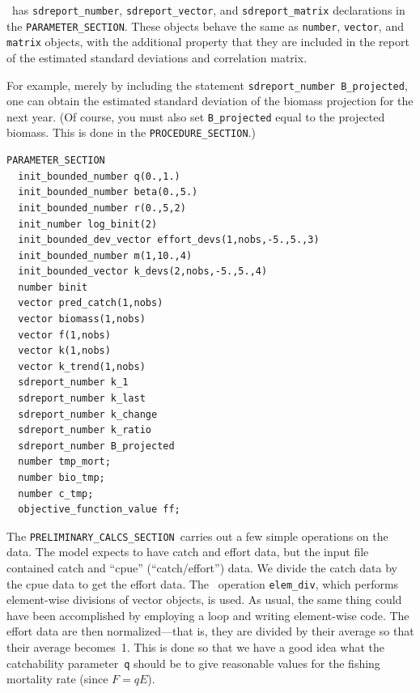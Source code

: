 \documentclass{admbmanual}
\newcommand\PS{\texttt{PARAMETER\_SECTION}}
\newcommand\PCS{\texttt{PRELIMINARY\_CALCS\_SECTION}}
\newcommand\PROS{\texttt{PROCEDURE\_SECTION}}
\begin{document}
\ADM\ has \texttt{sdreport\_number}, \texttt{sdreport\_vector}, and
\texttt{sdreport\_matrix} declarations in the \PS. These objects behave the same
as \texttt{number}, \texttt{vector}, and \texttt{matrix} objects, with the
additional property that they are included in the report of the estimated
standard deviations and correlation matrix.

For example, merely by including the statement
\texttt{sdreport\_number B\_projected}, one can obtain the estimated standard
deviation of the biomass projection for the next year. (Of course, you must also
set \texttt{B\_projected} equal to the projected biomass. This is done in the
\PROS.)
\begin{lstlisting}
PARAMETER_SECTION
  init_bounded_number q(0.,1.)
  init_bounded_number beta(0.,5.)
  init_bounded_number r(0.,5,2)
  init_number log_binit(2)
  init_bounded_dev_vector effort_devs(1,nobs,-5.,5.,3)
  init_bounded_number m(1,10.,4)
  init_bounded_vector k_devs(2,nobs,-5.,5.,4)
  number binit
  vector pred_catch(1,nobs)
  vector biomass(1,nobs)
  vector f(1,nobs)
  vector k(1,nobs)
  vector k_trend(1,nobs)
  sdreport_number k_1
  sdreport_number k_last
  sdreport_number k_change
  sdreport_number k_ratio
  sdreport_number B_projected
  number tmp_mort;
  number bio_tmp;
  number c_tmp;
  objective_function_value ff;
\end{lstlisting}

The \PCS\ carries out a few simple operations on the data. The model expects to
have catch and effort data, but the input file contained catch and ``cpue''
(``catch/effort'') data. We divide the catch data by the cpue data to get the
effort data. The \scAD\ operation \texttt{elem\_div}, which performs
element-wise divisions of vector objects, is used. As usual, the same thing
could have been accomplished by employing a loop and writing element-wise code.
The effort data are then normalized---that is, they are divided by their average
so that their average becomes~1. This is done so that we have a good idea what
the catchability parameter~\texttt{q} should be to give reasonable values for
the fishing mortality rate (since $F=qE$).
\end{document}
